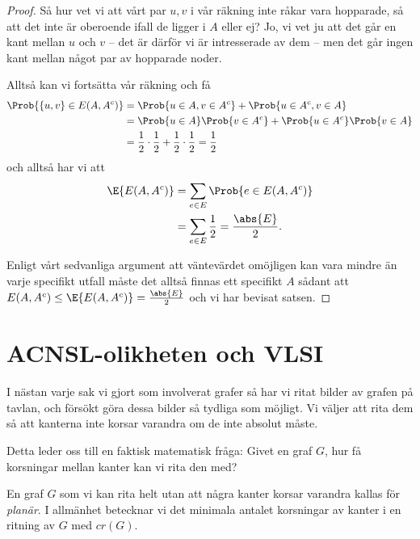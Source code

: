 \documentclass[nobib]{tufte-handout}
\begin{document}
\begin{proposition}
\begin{proof}
    Så hur vet vi att vårt par $u, v$ i vår räkning inte råkar vara hopparade, så att det inte är oberoende ifall de ligger i $A$ eller ej? Jo, vi vet ju att det går en kant mellan $u$ och $v$ -- det är därför vi är intresserade av dem -- men det går ingen kant mellan något par av hopparade noder.

    Alltså kan vi fortsätta vår räkning och få
    \begin{align*}
      \Prob{\{u,v\} \in E(A, A^c)} &= \Prob{u \in A, v \in A^c} + \Prob{u \in A^c, v \in A}\\
      &= \Prob{u \in A}\Prob{v \in A^c} + \Prob{u \in A^c}\Prob{v \in A}\\
      &= \frac{1}{2}\cdot\frac{1}{2} + \frac{1}{2}\cdot\frac{1}{2} = \frac{1}{2}
    \end{align*}
    och alltså har vi att
    \begin{align*}
      \E{E(A,A^c)} &= \sum_{e \in E} \Prob{e \in E(A, A^c)}\\
      &= \sum_{e \in E} \frac{1}{2} = \frac{\abs{E}}{2}.
    \end{align*}

    Enligt vårt sedvanliga argument att väntevärdet omöjligen kan vara mindre än varje specifikt utfall måste det alltså finnas ett specifikt $A$ sådant att $E(A, A^c) \leq \E{E(A,A^c)} = \frac{\abs{E}}{2}$ och vi har bevisat satsen.
  \end{proof}
\end{proposition}

\section{ACNSL-olikheten och VLSI}

I nästan varje sak vi gjort som involverat grafer så har vi ritat bilder av grafen på tavlan, och försökt göra dessa bilder så tydliga som möjligt. Vi väljer att rita dem så att kanterna inte korsar varandra om de inte absolut måste.

Detta leder oss till en faktisk matematisk fråga: Givet en graf $G$, hur få korsningar mellan kanter kan vi rita den med?

\begin{definition}
  En graf $G$ som vi kan rita helt utan att några kanter korsar varandra kallas för \emph{planär}. I allmänhet betecknar vi det minimala antalet korsningar av kanter i en ritning av $G$ med $cr(G)$.
\end{definition}
\end{document}
